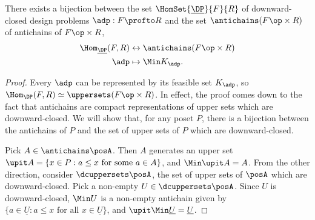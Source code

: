 \begin{lemma}
    There exists a bijection between the set $\HomSet{\underline{\DP}}{F}{R}$ of downward-closed design problems $\adp : F \profto R$ and the set $\antichains (F\op \times R)$ of antichains of $F\op \times R$, %
    \begin{equation}
        \begin{aligned}
            \Hom_{\underline{\DP}}(F,R) & \leftrightarrow \antichains (F\op \times R) \\
            \adp                        & \mapsto \Min K_\adp.
        \end{aligned}
    \end{equation}
\end{lemma}
\begin{proof}
    Every $\adp$ can be represented by its feasible set $K_\adp$, so $\Hom_\DP(F,R) \simeq \uppersets (F\op \times R)$.
    In effect, the proof comes down to the fact that antichains are compact representations of upper sets which are downward-closed.
    We will show that, for any poset $P$, there is a bijection between the antichains of $P$ and the set of upper sets of $P$ which are downward-closed.

    Pick $A \in \antichains\posA$.
    Then $A$ generates an upper set $\upit A = \{ x \in P : a \leq x \text{ for some $a \in A$} \}$, and $\Min \upit A = A$.
    From the other direction, consider $\dcuppersets \posA$, the set of upper sets of $\posA$ which are downward-closed.
    Pick a non-empty $U \in \dcuppersets \posA$.
    Since $U$ is downward-closed, $\Min U$ is a non-empty antichain given by $\{ a \in \underline{U} : a \leq x \text{ for all $x \in \underline{U}$} \}$, and $\upit \Min \underline{U} = \underline{U}$.
\end{proof}

